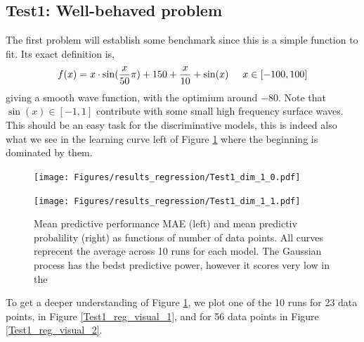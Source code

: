 \subsection*{Test1: Well-behaved problem}
The first problem will establish some benchmark since this is a simple function to fit. Its exact definition is,
$$f(x) = x\cdot \sin(\frac{x}{50} \pi) + 150 + \frac{x}{10} + \sin(x) \hspace{0.5cm} x \in [-100,100]$$
giving a smooth wave function, with the optimium around $-80$. Note that $\sin(x)\in [-1,1]$ contribute with
some small high frequency surface waves. This should be an easy task for the discriminative models, this is indeed 
also what we see in the learning curve left of Figure \ref{Test1_reg_plot} where the beginning is dominated by them. 

\begin{figure}[H]
  \centering
  \begin{minipage}[b]{0.49\textwidth}
   \texttt{[image: Figures/results\_regression/Test1\_dim\_1\_0.pdf]}
  \end{minipage}
  \hfill
  \begin{minipage}[b]{0.49\textwidth}
    \texttt{[image: Figures/results\_regression/Test1\_dim\_1\_1.pdf]}
   \end{minipage}
  \caption{Mean predictive performance MAE (left) and mean predictiv probalility (right) as
  functions of number of data points. All curves reprecent the average across 10 runs for each
  model. The Gaussian process has the bedst predictive power, however it scores very low in the }
  \label{Test1_reg_plot}
\end{figure}

To get a deeper understanding of Figure \ref{Test1_reg_plot}, we plot one of the 10 runs for 23 data points, 
in Figure \ref{Test1_reg_visual_1}, and for 56 data points in Figure \ref{Test1_reg_visual_2}.


